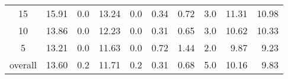 \begin{table}[H]
\begin{tabular}{c rr rr rrr rr}
      15 &    15.91 &      0.0 &    13.24 &      0.0 &          0.34 &          0.72 &      3.0 &            11.31 & 10.98 \\
      10 &    13.86 &      0.0 &    12.23 &      0.0 &          0.31 &          0.65 &      3.0 &            10.62 & 10.33 \\
       5 &    13.21 &      0.0 &    11.63 &      0.0 &          0.72 &          1.44 &      2.0 &             9.87 &  9.23 \\
\midrule
 overall &    13.60 &      0.2 &    11.71 &      0.2 &          0.31 &          0.68 &      5.0 &            10.16 &  9.83 \\
\bottomrule
\end{tabular}
\end{table}